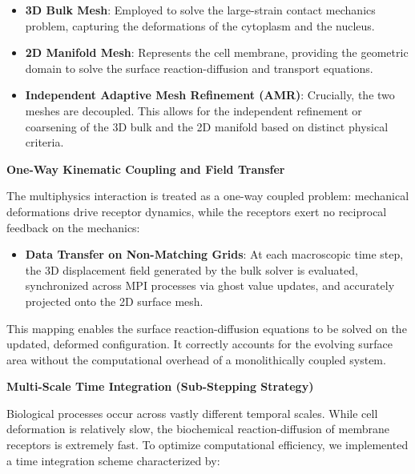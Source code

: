\documentclass[a4paper,12pt]{article}
\begin{document}
\begin{itemize}[left=1.5em, itemsep=0pt, topsep=0pt]
    \item 	\textbf{3D Bulk Mesh}: Employed to solve the large-strain contact mechanics problem, capturing the deformations of the cytoplasm and the nucleus.
    \item \textbf{2D Manifold Mesh}: Represents the cell membrane, providing the geometric domain to solve the surface reaction-diffusion and transport equations.
    \item 	\textbf{Independent Adaptive Mesh Refinement (AMR)}: Crucially, the two meshes are decoupled. This allows for the independent refinement or coarsening of the 3D bulk and the 2D manifold based on distinct physical criteria. 
\end{itemize}



\noindent\textbf{One-Way Kinematic Coupling and Field Transfer}


\noindent The multiphysics interaction is treated as a one-way coupled problem: mechanical deformations drive receptor dynamics, while the receptors exert no reciprocal feedback on the mechanics:

\begin{itemize}[left=1.5em, itemsep=0pt, topsep=0pt]
    \item \textbf{Data Transfer on Non-Matching Grids}:  At each macroscopic time step, the 3D displacement field generated by the bulk solver is evaluated, synchronized across MPI processes via ghost value updates, and accurately projected onto the 2D surface mesh.
\end{itemize}

  This mapping enables the surface reaction-diffusion equations to be solved on the updated, deformed configuration. It correctly accounts for the evolving surface area without the computational overhead of a monolithically coupled system.

\noindent\textbf{Multi-Scale Time Integration (Sub-Stepping Strategy)}

\noindent Biological processes occur across vastly different temporal scales. While cell deformation is relatively slow, the biochemical reaction-diffusion of membrane receptors is extremely fast. To optimize computational efficiency, we implemented a time integration scheme characterized by:
\end{document}
